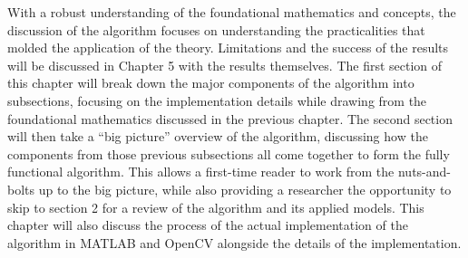 %
%
%
%
%
%
%
%
%

%
%
%



With a robust understanding of the foundational mathematics and concepts, the discussion of the algorithm focuses on understanding the practicalities that molded the application of the theory. Limitations and the success of the results will be discussed in Chapter 5 with the results themselves. The first section of this chapter will break down the major components of the algorithm into subsections, focusing on the implementation details while drawing from the foundational mathematics discussed in the previous chapter. The second section will then take a ``big picture'' overview of the algorithm, discussing how the components from those previous subsections all come together to form the fully functional algorithm. This allows a first-time reader to work from the nuts-and-bolts up to the big picture, while also providing a researcher the opportunity to skip to section 2 for a review of the algorithm and its applied models. This chapter will also discuss the process of the actual implementation of the algorithm in MATLAB\textsuperscript{\textregistered} and OpenCV alongside the details of the implementation.



